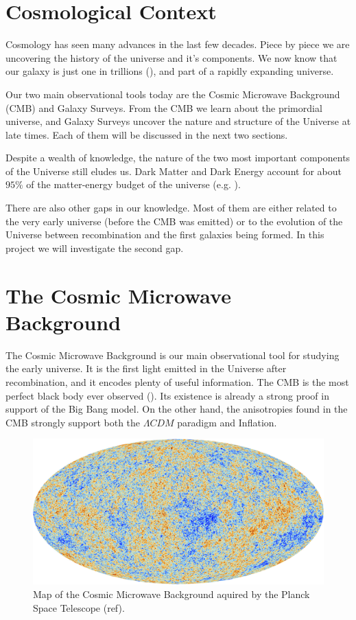 
\section{Cosmological Context}

Cosmology has seen many advances in the last few decades. Piece by piece we are uncovering the history of the universe and it's components. We now know that our galaxy is just one in trillions (\cite{2016ApJ...830...83C}), and part of a rapidly expanding universe. 

Our two main observational tools today are the Cosmic Microwave Background (CMB) and Galaxy Surveys. From the CMB we learn about the primordial universe, and Galaxy Surveys uncover the nature and structure of the Universe at late times. Each of them will be discussed in the next two sections.

Despite a wealth of knowledge, the nature of the two most important components of the Universe still eludes us. Dark Matter and Dark Energy account for about $95\%$ of the matter-energy budget of the universe (e.g. \cite{2016A&A...594A..13P}). 

There are also other gaps in our knowledge. Most of them are either related to the very early universe (before the CMB was emitted) or to the evolution of the Universe between recombination and the first galaxies being formed. In this project we will investigate the second gap.

\section{The Cosmic Microwave Background}

The Cosmic Microwave Background is our main observational tool for studying the early universe. It is the first light emitted in the Universe after recombination, and it encodes plenty of useful information. The CMB is the most perfect black body ever observed (\cite{1999dpf..conf.....W}). Its existence is already a strong proof in support of the Big Bang model. On the other hand, the anisotropies found in the CMB strongly support both the $\Lambda CDM$ paradigm and Inflation.

\begin{figure}
    \centering
    \includegraphics[width=0.9\columnwidth]{images/misc/Planck_CMB.jpg}%
    
    \caption{
    Map of the Cosmic Microwave Background aquired by the Planck Space Telescope (ref). 
    }
    
    \label{fig:1}
\end{figure}


